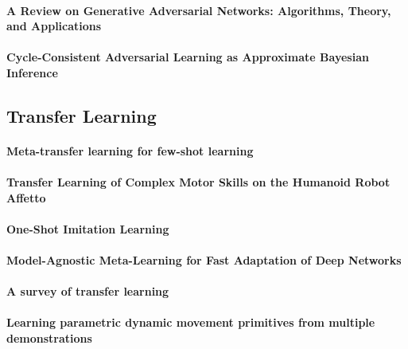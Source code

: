 \documentclass[11pt]{article}
\begin{document}
\paragraph{A Review on Generative Adversarial Networks: Algorithms, Theory, and Applications} \citep{gui_review_2020}

\paragraph{Cycle-Consistent Adversarial Learning as Approximate Bayesian Inference} \citep{tiao_cycle-consistent_2018}


\subsection{Transfer Learning}
\paragraph{Meta-transfer learning for few-shot learning} \citep{sun_meta-transfer_2019}

\paragraph{Transfer Learning of Complex Motor Skills on the Humanoid Robot Affetto} \citep{schulz_transfer_2018}

\paragraph{One-Shot Imitation Learning} \citep{duan_one-shot_2017}

\paragraph{Model-Agnostic Meta-Learning for Fast Adaptation of Deep Networks} \citep{finn_model-agnostic_2017}

\paragraph{A survey of transfer learning} \citep{weiss_survey_2016}

\paragraph{Learning parametric dynamic movement primitives from multiple demonstrations} \citep{matsubara_learning_2011}
\end{document}
